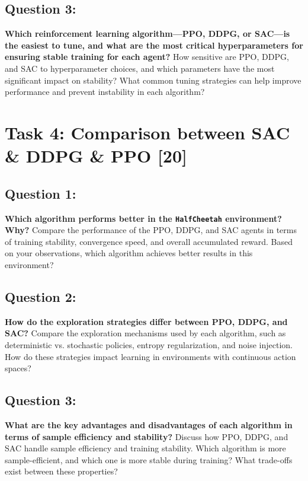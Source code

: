 \documentclass[12pt]{article}
\begin{document}
{{{\vspace*{0.3cm}

\subsection{Question 3:}
\textbf{Which reinforcement learning algorithm—PPO, DDPG, or SAC—is the easiest to tune, and what are the most critical hyperparameters for ensuring stable training for each agent?}
\newline
How sensitive are PPO, DDPG, and SAC to hyperparameter choices, and which parameters have the most significant impact on stability?
What common tuning strategies can help improve performance and prevent instability in each algorithm?


\newpage

\section{Task 4: Comparison between SAC \& DDPG \& PPO [20]}

\subsection{Question 1:}
\textbf{Which algorithm performs better in the \texttt{HalfCheetah} environment? Why?}
\newline
Compare the performance of the PPO, DDPG, and SAC agents in terms of training stability, convergence speed, and overall accumulated reward. Based on your observations, which algorithm achieves better results in this environment?

\subsection{Question 2:}
\textbf{How do the exploration strategies differ between PPO, DDPG, and SAC?}
\newline
Compare the exploration mechanisms used by each algorithm, such as deterministic vs. stochastic policies, entropy regularization, and noise injection. How do these strategies impact learning in environments with continuous action spaces?

\subsection{Question 3:}
\textbf{What are the key advantages and disadvantages of each algorithm in terms of sample efficiency and stability?}
\newline
Discuss how PPO, DDPG, and SAC handle sample efficiency and training stability. Which algorithm is more sample-efficient, and which one is more stable during training? What trade-offs exist between these properties?

}}}
\end{document}
